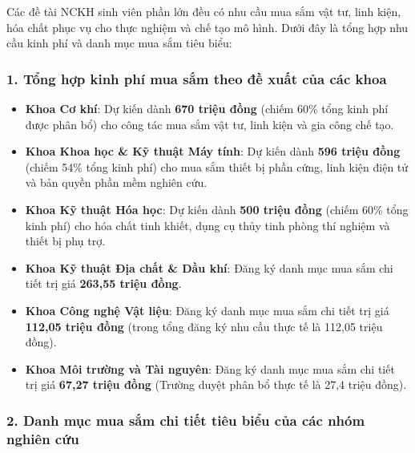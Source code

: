 \documentclass[11pt,a4paper]{article}
\providecommand{\tightlist}{%
  \setlength{\itemsep}{0pt}\setlength{\parskip}{0pt}}
\begin{document}
Các đề tài NCKH sinh viên phần lớn đều có nhu cầu mua sắm vật tư, linh
kiện, hóa chất phục vụ cho thực nghiệm và chế tạo mô hình. Dưới đây là
tổng hợp nhu cầu kinh phí và danh mục mua sắm tiêu biểu:

\subsubsection{1. Tổng hợp kinh phí mua sắm theo đề xuất của các
khoa}\label{tux1ed5ng-hux1ee3p-kinh-phuxed-mua-sux1eafm-theo-ux111ux1ec1-xuux1ea5t-cux1ee7a-cuxe1c-khoa}

\begin{itemize}
\tightlist
\item
  \textbf{Khoa Cơ khí}: Dự kiến dành \textbf{670 triệu đồng} (chiếm 60\%
  tổng kinh phí được phân bổ) cho công tác mua sắm vật tư, linh kiện và
  gia công chế tạo.
\item
  \textbf{Khoa Khoa học \& Kỹ thuật Máy tính}: Dự kiến dành \textbf{596
  triệu đồng} (chiếm 54\% tổng kinh phí) cho mua sắm thiết bị phần cứng,
  linh kiện điện tử và bản quyền phần mềm nghiên cứu.
\item
  \textbf{Khoa Kỹ thuật Hóa học}: Dự kiến dành \textbf{500 triệu đồng}
  (chiếm 60\% tổng kinh phí) cho hóa chất tinh khiết, dụng cụ thủy tinh
  phòng thí nghiệm và thiết bị phụ trợ.
\item
  \textbf{Khoa Kỹ thuật Địa chất \& Dầu khí}: Đăng ký danh mục mua sắm
  chi tiết trị giá \textbf{263,55 triệu đồng}.
\item
  \textbf{Khoa Công nghệ Vật liệu}: Đăng ký danh mục mua sắm chi tiết
  trị giá \textbf{112,05 triệu đồng} (trong tổng đăng ký nhu cầu thực tế
  là 112,05 triệu đồng).
\item
  \textbf{Khoa Môi trường và Tài nguyên}: Đăng ký danh mục mua sắm chi
  tiết trị giá \textbf{67,27 triệu đồng} (Trường duyệt phân bổ thực tế
  là 27,4 triệu đồng).
\end{itemize}

\subsubsection{2. Danh mục mua sắm chi tiết tiêu biểu của các nhóm
nghiên
cứu}\label{danh-mux1ee5c-mua-sux1eafm-chi-tiux1ebft-tiuxeau-biux1ec3u-cux1ee7a-cuxe1c-nhuxf3m-nghiuxean-cux1ee9u}
\end{document}
